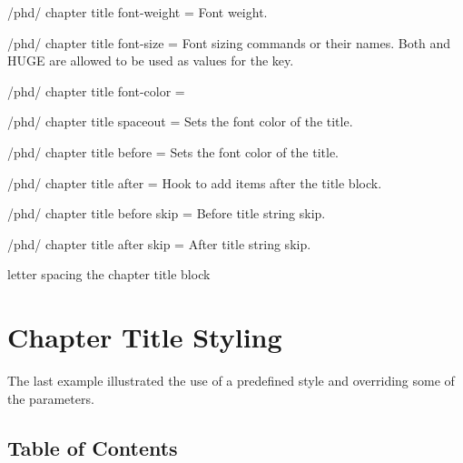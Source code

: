 \begin{key}{/phd/ chapter title font-weight = } Font weight.
\end{key}

\begin{key}{/phd/ chapter title font-size = }Font sizing commands or their names. Both \cmd{\HUGE} and HUGE are allowed to be used as values for the key.
\end{key}

\begin{key}{/phd/ chapter title font-color = }
\end{key}
\begin{key}{/phd/ chapter title spaceout = }
Sets the font color of the title.
\end{key}
\begin{key}{/phd/ chapter title before = }
Sets the font color of the title.
\end{key}
\begin{key}{/phd/ chapter title after = }
Hook to add items after the title block.
\end{key}
 
\begin{key}{/phd/ chapter title before skip = }
Before title string skip.
\end{key}
  \begin{key}{/phd/ chapter title after skip = }
After title string skip.
\end{key}



\begin{texexample}{letter spacing the chapter title block}{}
\chapter{Chapter Title Styling}
\end{texexample}



The last example illustrated the use of a predefined style  and overriding some of the parameters.


\section{Table of Contents}

